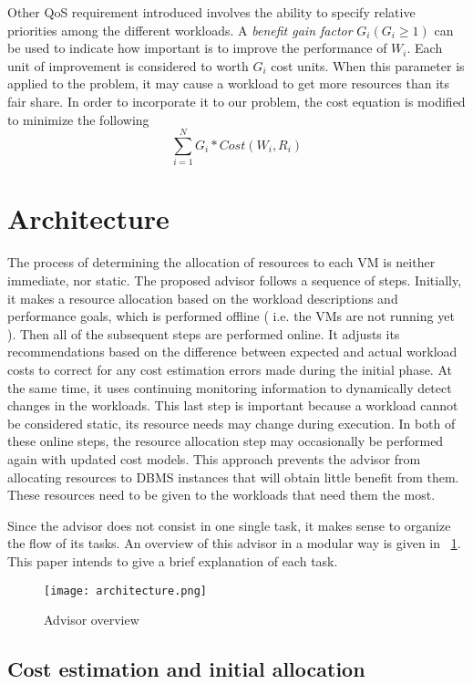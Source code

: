 Other QoS requirement introduced involves the ability to specify relative priorities among the different workloads. A \textit{benefit gain factor} $G_{i} (G_{i} \geq 1)$ can be used to indicate how important is to improve the performance of $W_{i}$. Each unit of improvement is considered to worth $G_{i}$ cost units. When this parameter is applied to the problem, it may cause a workload to get more resources than its fair share. In order to incorporate it to our problem, the cost equation is modified to minimize the following
\[
  \sum_{i=1}^{N} G_{i} * Cost(W_{i},R_{i})
\]


\section{Architecture}

The process of  determining the allocation of resources to each VM is neither immediate, nor static. The proposed advisor follows a sequence of steps. Initially, it makes a resource allocation based on the workload descriptions and performance goals, which is performed offline ( i.e. the VMs are not running yet ). Then all of the subsequent steps are performed online. It adjusts its recommendations based on the difference between expected and actual workload costs to correct for any cost estimation errors made during the initial phase. At the same time, it uses continuing monitoring information to dynamically detect changes in the workloads. This last step is important because a workload cannot be considered static, its resource needs may change during execution. In both of these online steps, the resource allocation step may occasionally be performed again with updated cost models. This approach prevents the advisor from allocating resources to DBMS instances that will obtain little benefit from them. These resources need to be given to the workloads that need them the most.

Since the advisor does not consist in one single task, it makes sense to organize the flow of its tasks. An overview of this advisor in a modular way is given in ~\ref{fig:architecture}. This paper intends to give a brief explanation of each task.


\begin{figure}[ht]
\centering
\texttt{[image: architecture.png]}
\caption{Advisor overview}
\label{fig:architecture}
\end{figure} 

\subsection{Cost estimation and initial allocation}


